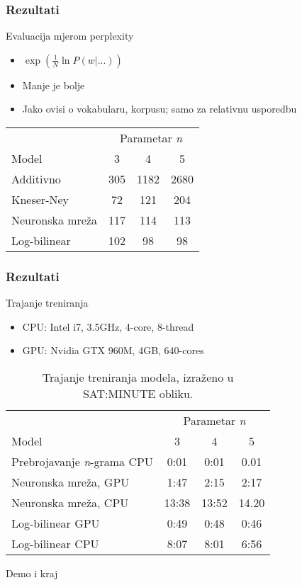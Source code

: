 \documentclass[utf8]{beamer}
\begin{document}
\begin{frame}
\frametitle{Rezultati}

	\begin{block}{Evaluacija mjerom perplexity}
	\begin{itemize}
		\item{$\exp \left( \frac{1}{N} \ln P(w | ...) \right)$}
		\item{Manje je bolje}
		\item{Jako ovisi o vokabularu, korpusu; samo za relativnu usporedbu}
	\end{itemize}
	\end{block}


	\begin{table}[htb]
	\centering
	\begin{tabular}{lccc}
	\toprule
	 & \multicolumn{3}{c}{Parametar \textit{n}} \\
	\cmidrule(r){2-4}
	Model & 3 & 4 & 5 \\
	\midrule
	Additivno &  305 & 1182 & 2680 \\
	Kneser-Ney & 72 & 121 & 204 \\
	Neuronska mreža & 117 & 114 & 113 \\
	Log-bilinear & 102 & 98 & 98 \\
	\bottomrule
	\end{tabular}
	\end{table}

\end{frame}

\begin{frame}
\frametitle{Rezultati}

	\begin{block}{Trajanje treniranja}
	\begin{itemize}
		\item{CPU: Intel i7, 3.5GHz, 4-core, 8-thread}
		\item{GPU: Nvidia GTX 960M, 4GB, 640-cores}
	\end{itemize}
	\end{block}


	\begin{table}[htb]
	\caption{Trajanje treniranja modela, izraženo u SAT:MINUTE obliku.}
	\label{tbl:eval_time}
	\centering
	\begin{tabular}{lccc}
	\toprule
	 & \multicolumn{3}{c}{Parametar \textit{n}} \\
	\cmidrule(r){2-4}
	Model & 3 & 4 & 5 \\
	\midrule
	Prebrojavanje \textit{n}-grama CPU &  0:01 & 0:01 & 0.01 \\
	Neuronska mreža, GPU & 1:47 & 2:15 & 2:17 \\
	Neuronska mreža, CPU & 13:38 & 13:52 & 14.20 \\
	Log-bilinear GPU & 0:49 & 0:48 & 0:46 \\
	Log-bilinear CPU & 8:07 & 8:01 & 6:56 \\
	\bottomrule
	\end{tabular}
	\end{table}

\end{frame}

\begin{frame}

	Demo i kraj
	
\end{frame}

\end{document}
